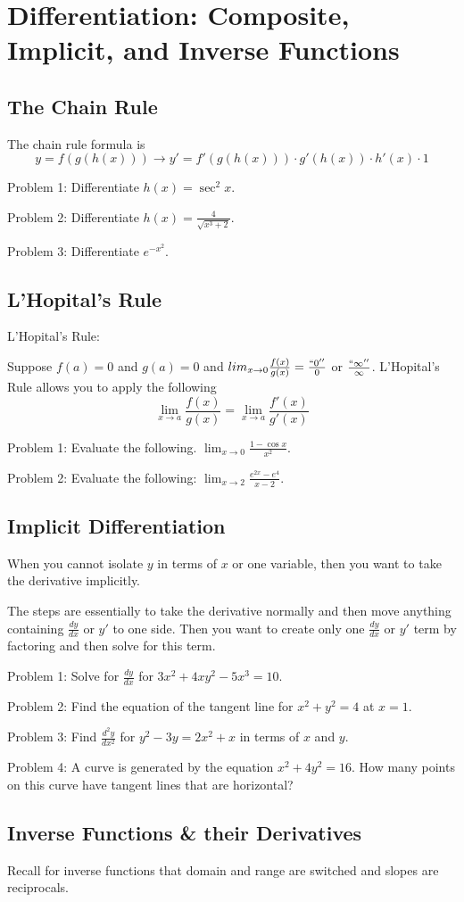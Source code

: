\documentclass[../abcalc.tex]{subfiles}
\begin{document}
\chapter{Differentiation: Composite, Implicit, and Inverse Functions}
\section{The Chain Rule}
The chain rule formula is 
\[y=f(g(h(x))) \rightarrow y'=f'(g(h(x)))\cdot g'(h(x))\cdot h'(x)\cdot 1\]

Problem 1: Differentiate $h(x)=\sec^2 x$.

Problem 2: Differentiate $h(x)=\frac{4}{\sqrt{x^3+2}}$.

Problem 3: Differentiate $e^{-x^2}$.
\section{L'Hopital's Rule}
L'Hopital's Rule:

Suppose $f(a)=0$ and $g(a)=0$ and $lim_{x\to 0}\frac{f(x)}{g(x)}=\frac{``0''}{0}$ or $\frac{``\infty''}{\infty}$. L'Hopital's Rule allows 
you to apply the following
\[\lim_{x\to a}\frac{f(x)}{g(x)}=\lim_{x\to a}\frac{f'(x)}{g'(x)}\]

Problem 1: Evaluate the following. $\lim_{x\to 0}\frac{1-\cos x}{x^2}$.

Problem 2: Evaluate the following: $\lim_{x\to 2}\frac{e^{2x}-e^4}{x-2}$.
\section{Implicit Differentiation}
When you cannot isolate $y$ in terms of $x$ or one variable, then you want to take the derivative implicitly.

The steps are essentially to take the derivative normally and then move anything containing $\frac{dy}{dx}$ or $y'$ to one side. Then you 
want to create only one $\frac{dy}{dx}$ or $y'$ term by factoring and then solve for this term.

Problem 1: Solve for $\frac{dy}{dx}$ for $3x^2+4xy^2-5x^3=10$.

Problem 2: Find the equation of the tangent line for $x^2+y^2=4$ at $x=1$.

Problem 3: Find $\frac{d^2y}{dx^2}$ for $y^2-3y=2x^2+x$ in terms of $x$ and $y$.

Problem 4: A curve is generated by the equation $x^2+4y^2=16$. How many points on this curve have tangent lines that are horizontal?
\section{Inverse Functions \& their Derivatives}
Recall for inverse functions that domain and range are switched and slopes are reciprocals. 
\end{document}

